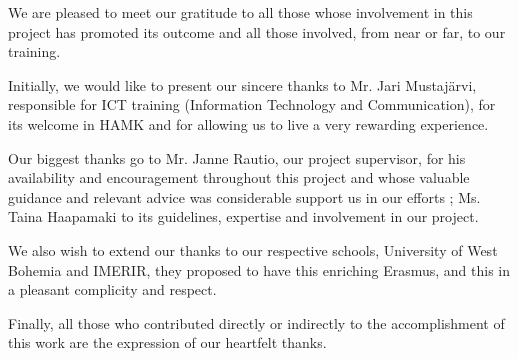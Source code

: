 







We are pleased to meet our gratitude to all those whose involvement in this project has promoted its outcome and all those involved, from near or far, to our training.

Initially, we would like to present our sincere thanks to Mr. Jari Mustajärvi, responsible for ICT training (Information Technology and Communication), for its welcome in HAMK and for allowing us to live a very rewarding experience.

Our biggest thanks go to Mr. Janne Rautio, our project supervisor, for his availability and encouragement throughout this project and whose valuable guidance and relevant advice was considerable support us in our efforts ; Ms. Taina Haapamaki to its guidelines, expertise and involvement in our project.

We also wish to extend our thanks to our respective schools, University of West Bohemia and IMERIR, they proposed to have this enriching Erasmus, and this in a pleasant complicity and respect.

Finally, all those who contributed directly or indirectly to the accomplishment of this work are the expression of our heartfelt thanks.

